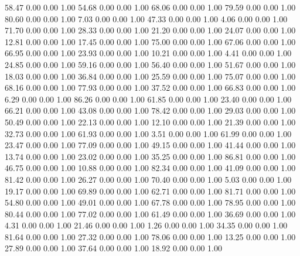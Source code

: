    58.47   0.00   0.00   1.00
   54.68   0.00   0.00   1.00
   68.06   0.00   0.00   1.00
   79.59   0.00   0.00   1.00
   80.60   0.00   0.00   1.00
    7.03   0.00   0.00   1.00
   47.33   0.00   0.00   1.00
    4.06   0.00   0.00   1.00
   71.70   0.00   0.00   1.00
   28.33   0.00   0.00   1.00
   21.20   0.00   0.00   1.00
   24.07   0.00   0.00   1.00
   12.81   0.00   0.00   1.00
   17.45   0.00   0.00   1.00
   75.00   0.00   0.00   1.00
   67.06   0.00   0.00   1.00
   66.95   0.00   0.00   1.00
   23.93   0.00   0.00   1.00
   10.21   0.00   0.00   1.00
    4.41   0.00   0.00   1.00
   24.85   0.00   0.00   1.00
   59.16   0.00   0.00   1.00
   56.40   0.00   0.00   1.00
   51.67   0.00   0.00   1.00
   18.03   0.00   0.00   1.00
   36.84   0.00   0.00   1.00
   25.59   0.00   0.00   1.00
   75.07   0.00   0.00   1.00
   68.16   0.00   0.00   1.00
   77.93   0.00   0.00   1.00
   37.52   0.00   0.00   1.00
   66.83   0.00   0.00   1.00
    6.29   0.00   0.00   1.00
   86.26   0.00   0.00   1.00
   61.85   0.00   0.00   1.00
   23.40   0.00   0.00   1.00
   66.21   0.00   0.00   1.00
   43.08   0.00   0.00   1.00
   78.42   0.00   0.00   1.00
   29.03   0.00   0.00   1.00
   50.49   0.00   0.00   1.00
   22.13   0.00   0.00   1.00
   12.10   0.00   0.00   1.00
   21.39   0.00   0.00   1.00
   32.73   0.00   0.00   1.00
   61.93   0.00   0.00   1.00
    3.51   0.00   0.00   1.00
   61.99   0.00   0.00   1.00
   23.47   0.00   0.00   1.00
   77.09   0.00   0.00   1.00
   49.15   0.00   0.00   1.00
   41.44   0.00   0.00   1.00
   13.74   0.00   0.00   1.00
   23.02   0.00   0.00   1.00
   35.25   0.00   0.00   1.00
   86.81   0.00   0.00   1.00
   46.75   0.00   0.00   1.00
   10.88   0.00   0.00   1.00
   82.34   0.00   0.00   1.00
   41.09   0.00   0.00   1.00
   81.42   0.00   0.00   1.00
   26.27   0.00   0.00   1.00
   70.40   0.00   0.00   1.00
    5.03   0.00   0.00   1.00
   19.17   0.00   0.00   1.00
   69.89   0.00   0.00   1.00
   62.71   0.00   0.00   1.00
   81.71   0.00   0.00   1.00
   54.80   0.00   0.00   1.00
   49.01   0.00   0.00   1.00
   67.78   0.00   0.00   1.00
   78.95   0.00   0.00   1.00
   80.44   0.00   0.00   1.00
   77.02   0.00   0.00   1.00
   61.49   0.00   0.00   1.00
   36.69   0.00   0.00   1.00
    4.31   0.00   0.00   1.00
   21.46   0.00   0.00   1.00
    1.26   0.00   0.00   1.00
   34.35   0.00   0.00   1.00
   81.64   0.00   0.00   1.00
   27.32   0.00   0.00   1.00
   78.06   0.00   0.00   1.00
   13.25   0.00   0.00   1.00
   27.89   0.00   0.00   1.00
   37.64   0.00   0.00   1.00
   18.92   0.00   0.00   1.00
